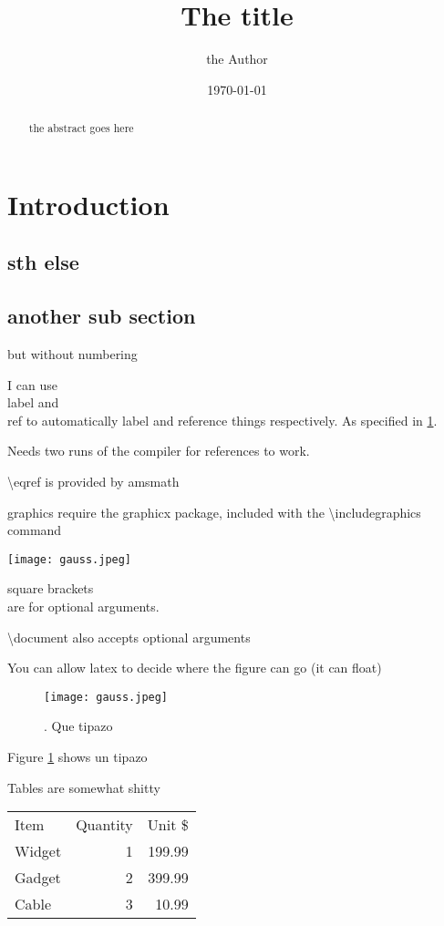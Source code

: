 \documentclass{article}
\title{The title}
\author{the Author}
\date{\today}
\begin{document}
\maketitle
\tableofcontents

\begin{abstract}
\label{sec:abstract}
    the abstract goes here
\end{abstract}

\section{Introduction}
\label{sec:intro}


\subsection{sth else}

\subsection*{another sub section}
but without numbering

I can use \\label and \\ref to automatically label and reference things
respectively. As specified in \ref{sec:intro}.

Needs two runs of the compiler for references  to work.

\textbackslash eqref is provided by amsmath

graphics require the graphicx package, included with the \textbackslash includegraphics command

\texttt{[image: gauss.jpeg]}

square brackets \[ \] are for optional arguments.

\textbackslash document also accepts optional arguments

You can allow latex to decide where the figure can go (it can float)

\begin{figure}
\centering
    \texttt{[image: gauss.jpeg]}
\caption{\label{fig:gauss}. Que tipazo}
\end{figure}

Figure \ref{fig:gauss} shows un tipazo

Tables are somewhat shitty

\begin{tabular}{lrr} %
Item    & Quantity  & Unit \$   \\
Widget  & 1         & 199.99    \\
Gadget  & 2         & 399.99    \\
Cable   & 3         & 10.99     \\
\end{tabular}
\end{document}
